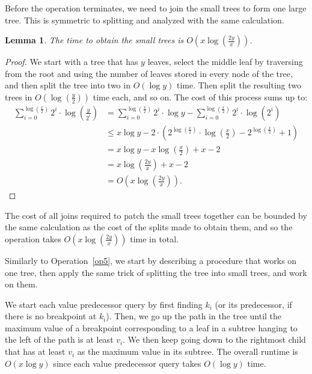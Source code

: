 \documentclass[11pt,a4paper]{article}
\newtheorem{lemma}{Lemma}
\theoremstyle{definition}
\theoremstyle{remark}
\begin{document}
Before the operation terminates, we need to join the small trees to form one large tree. This is symmetric to splitting and analyzed with the same
calculation.
\begin{lemma}
\label{running time to obtain small trees lemma}
The time to obtain the small trees is $O(x \log (\frac{2y}{x}))$.
\end{lemma}
\begin{proof}
We start with a tree that has $y$ leaves, select the middle leaf by traversing from the root and using the number of leaves stored in every node of the tree, and then split the tree into two in $O(\log y)$ time. Then split the resulting two trees in $O(\log(\frac{y}{2}))$ time each, and so on. The cost of this process sums up to:
\begin{align*}
 \sum_{i=0}^{\log (\frac{x}{2})} 2^i \cdot \log (\frac{y}{2^i}) & = \sum_{i=0}^{\log (\frac{x}{2})} 2^i \cdot \log y - \sum_{i=0}^{\log (\frac{x}{2})} 2^i \cdot \log (2^i)  \\
& \leq x \log y - 2 \cdot (2^{ \log ( \frac{x}{2})} \cdot \log ( \frac{x}{2}) - 2^{ \log ( \frac{x}{2})}+1)  \\
& = x \log y  -  x \log (\frac{x}{2}) + x - 2 \\ 
&= x \log (\frac{2y}{x}) + x -2 \\
& = O(x \log (\frac{2y}{x})).
\end{align*}
\end{proof}

The cost of all joins required to patch the small trees together can be bounded by the same calculation as the cost of the splits made to obtain them, and so the operation takes $O(x \log (\frac{2y}{x}))$ time in total.

\vspace{0.04in} 
Similarly to Operation~\ref{op5}, we start by describing a procedure that works on one tree, then apply the same trick of splitting the tree into small trees, and work on them.

We start each value predecessor query by first finding $k_i$ (or its predecessor, if there is no breakpoint at $k_i$). Then, we go up the path in the tree until the maximum value of a breakpoint corresponding to a leaf in a subtree hanging to the left of the path is at least $v_i$. We then keep going down to the rightmost child that has at least $v_i$ as the maximum value in its subtree. The overall runtime is $O(x \log y)$ since each value predecessor query takes $O(\log y)$ time.
\end{document}
